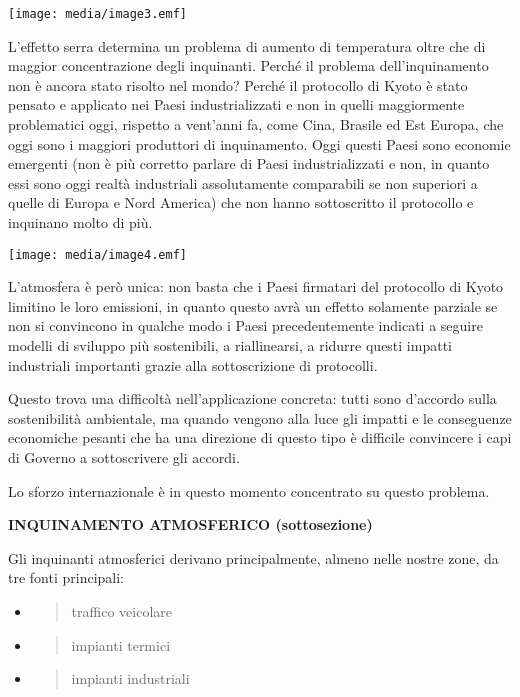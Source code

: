 \documentclass[]{article}
\begin{document}
\texttt{[image: media/image3.emf]}

L'effetto serra determina un problema di aumento di temperatura oltre
che di maggior concentrazione degli inquinanti. Perché il problema
dell'inquinamento non è ancora stato risolto nel mondo? Perché il
protocollo di Kyoto è stato pensato e applicato nei Paesi
industrializzati e non in quelli maggiormente problematici oggi,
rispetto a vent'anni fa, come Cina, Brasile ed Est Europa, che oggi sono
i maggiori produttori di inquinamento. Oggi questi Paesi sono economie
emergenti (non è più corretto parlare di Paesi industrializzati e non,
in quanto essi sono oggi realtà industriali assolutamente comparabili se
non superiori a quelle di Europa e Nord America) che non hanno
sottoscritto il protocollo e inquinano molto di più.

\texttt{[image: media/image4.emf]}

L'atmosfera è però unica: non basta che i Paesi firmatari del protocollo
di Kyoto limitino le loro emissioni, in quanto questo avrà un effetto
solamente parziale se non si convincono in qualche modo i Paesi
precedentemente indicati a seguire modelli di sviluppo più sostenibili,
a riallinearsi, a ridurre questi impatti industriali importanti grazie
alla sottoscrizione di protocolli.

Questo trova una difficoltà nell'applicazione concreta: tutti sono
d'accordo sulla sostenibilità ambientale, ma quando vengono alla luce
gli impatti e le conseguenze economiche pesanti che ha una direzione di
questo tipo è difficile convincere i capi di Governo a sottoscrivere gli
accordi.

Lo sforzo internazionale è in questo momento concentrato su questo
problema.

\textbf{INQUINAMENTO ATMOSFERICO (sottosezione)}

Gli inquinanti atmosferici derivano principalmente, almeno nelle nostre
zone, da tre fonti principali:

\begin{itemize}
\item
  \begin{quote}
  traffico veicolare
  \end{quote}
\item
  \begin{quote}
  impianti termici
  \end{quote}
\item
  \begin{quote}
  impianti industriali
  \end{quote}
\end{itemize}
\end{document}

